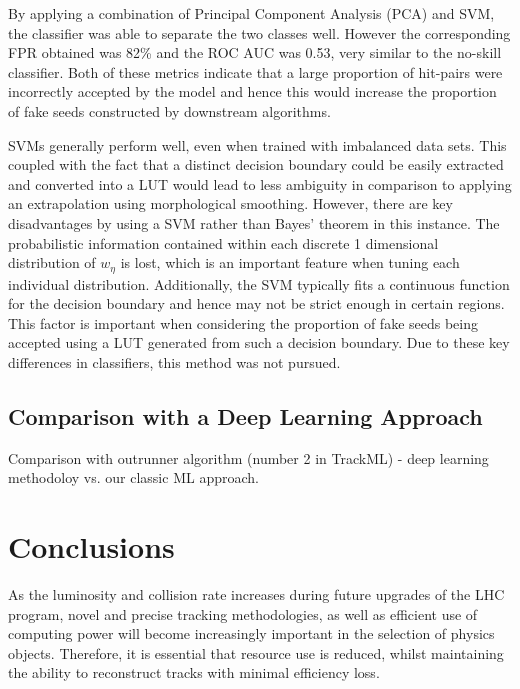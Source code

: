 By applying a combination of Principal Component Analysis (PCA) and SVM, the classifier was able to separate the two classes well. However the corresponding FPR obtained was 82\% and the ROC AUC was 0.53, very similar to the no-skill classifier. Both of these metrics indicate that a large proportion of hit-pairs were incorrectly accepted by the model and hence this would increase the proportion of fake seeds constructed by downstream algorithms.

SVMs generally perform well, even when trained with imbalanced data sets. This coupled with the fact that a distinct decision boundary could be easily extracted and converted into a LUT would lead to less ambiguity in comparison to applying an extrapolation using morphological smoothing. However, there are key disadvantages by using a SVM rather than Bayes' theorem in this instance. The probabilistic information contained within each discrete 1 dimensional distribution of $w_{\eta}$ is lost, which is an important feature when tuning each individual distribution. Additionally, the SVM typically fits a continuous function for the decision boundary and hence may not be strict enough in certain regions. This factor is important when considering the proportion of fake seeds being accepted using a LUT generated from such a decision boundary. Due to these key differences in classifiers, this method was not pursued.


\subsection{Comparison with a Deep Learning Approach}

Comparison with outrunner algorithm (number 2 in TrackML) - deep learning methodoloy vs. our classic ML approach.


\section{Conclusions}

As the luminosity and collision rate increases during future upgrades of the LHC program, novel and precise tracking methodologies, as well as efficient use of computing power will become increasingly important in the selection of physics objects. Therefore, it is essential that resource use is reduced, whilst maintaining the ability to reconstruct tracks with minimal efficiency loss. 

